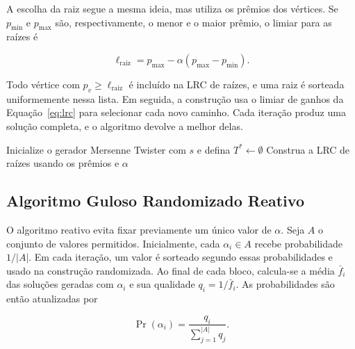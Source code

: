 \documentclass[12pt]{article}
\begin{document}
A escolha da raiz segue a mesma ideia, mas utiliza os prêmios dos vértices. Se $p_{\min}$ e $p_{\max}$ são, respectivamente, o menor e o maior prêmio, o limiar para as raízes é

\begin{equation}
    \ell_{\mathrm{raiz}}=p_{\max}-\alpha(p_{\max}-p_{\min}).
    \label{eq:limiar-raiz}
\end{equation}

Todo vértice com $p_v\geq\ell_{\mathrm{raiz}}$ é incluído na LRC de raízes, e uma raiz é sorteada uniformemente nessa lista. Em seguida, a construção usa o limiar de ganhos da Equação~\eqref{eq:lrc} para selecionar cada novo caminho. Cada iteração produz uma solução completa, e o algoritmo devolve a melhor delas.

\begin{algorithm}[htbp]
\caption{Guloso randomizado}
\label{alg:randomizado}
Inicialize o gerador Mersenne Twister com $s$ e defina $T^*\leftarrow\emptyset$\;
Construa a LRC de raízes usando os prêmios e $\alpha$\;
\;
\end{algorithm}

\subsection{Algoritmo Guloso Randomizado Reativo}

O algoritmo reativo evita fixar previamente um único valor de $\alpha$. Seja $A$ o conjunto de valores permitidos. Inicialmente, cada $\alpha_i\in A$ recebe probabilidade $1/|A|$. Em cada iteração, um valor é sorteado segundo essas probabilidades e usado na construção randomizada. Ao final de cada bloco, calcula-se a média $\bar f_i$ das soluções geradas com $\alpha_i$ e sua qualidade $q_i=1/\bar f_i$. As probabilidades são então atualizadas por

\begin{equation}
    \Pr(\alpha_i)=\frac{q_i}{\sum_{j=1}^{|A|}q_j}.
    \label{eq:probabilidade}
\end{equation}
\end{document}

